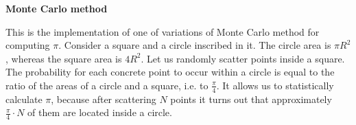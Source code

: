 \documentclass[12pt]{article}
\begin{document}
\begin{titlepage}
\begin{center}
	\LARGE\textbf{Monte Carlo method}
\end{center}
\large
This is the implementation of one of variations of Monte Carlo method for computing $\pi$. Consider a square and a circle inscribed in it. The circle area is $\pi{R}^2$, whereas the square area is $4{R}^2$. Let us randomly scatter points inside a square. The probability for each concrete point to occur within a circle is equal to the ratio of the areas of a circle and a square, i.e. \!\!to $\frac{\pi}{4}$. It allows us to statistically calculate $\pi$, because after scattering $N$ points it turns out that approximately $\frac{\pi}{4}\cdot N$ of them are located inside a circle.

\end{titlepage}
\end{document}
